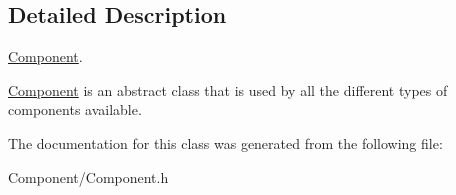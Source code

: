 \subsection{Detailed Description}
\hyperlink{classrvl_1_1_component}{Component}. 

\hyperlink{classrvl_1_1_component}{Component} is an abstract class that is used by all the different types of components available. 

The documentation for this class was generated from the following file\+:\begin{DoxyCompactItemize}
\item 
Component/Component.\+h\end{DoxyCompactItemize}
